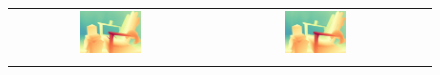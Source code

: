 \documentclass[10pt,twocolumn,letterpaper]{article}
\begin{document}
\begin{figure}[h]
\begin{tabular}{ccc}
        \includegraphics[width=0.32\textwidth]{imgs/middlebury/stereo/Selective/0.jpg} &
        \includegraphics[width=0.32\textwidth]{imgs/middlebury/stereo/Ours/0.jpg} \\ \\


\end{tabular}
\end{figure}
\end{document}
